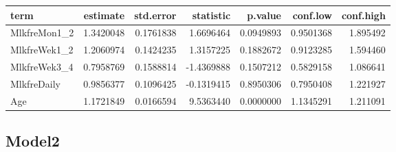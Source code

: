 \documentclass[]{article}
\newenvironment{Shaded}{\begin{snugshade}}{\end{snugshade}}
\newcommand{\DataTypeTok}[1]{\textcolor[rgb]{0.13,0.29,0.53}{#1}}
\newcommand{\KeywordTok}[1]{\textcolor[rgb]{0.13,0.29,0.53}{\textbf{#1}}}
\newcommand{\NormalTok}[1]{#1}
\newcommand{\OperatorTok}[1]{\textcolor[rgb]{0.81,0.36,0.00}{\textbf{#1}}}
\newcommand{\OtherTok}[1]{\textcolor[rgb]{0.56,0.35,0.01}{#1}}
\newcommand{\StringTok}[1]{\textcolor[rgb]{0.31,0.60,0.02}{#1}}
\begin{document}
\begin{longtable}[]{@{}lrrrrrr@{}}
\toprule
term & estimate & std.error & statistic & p.value & conf.low &
conf.high\tabularnewline
\midrule
\endhead
MlkfreMon1\_2 & 1.3420048 & 0.1761838 & 1.6696464 & 0.0949893 &
0.9501368 & 1.895492\tabularnewline
MlkfreWek1\_2 & 1.2060974 & 0.1424235 & 1.3157225 & 0.1882672 &
0.9123285 & 1.594460\tabularnewline
MlkfreWek3\_4 & 0.7958769 & 0.1588814 & -1.4369888 & 0.1507212 &
0.5829158 & 1.086641\tabularnewline
MlkfreDaily & 0.9856377 & 0.1096425 & -0.1319415 & 0.8950306 & 0.7950408
& 1.221927\tabularnewline
Age & 1.1721849 & 0.0166594 & 9.5363440 & 0.0000000 & 1.1345291 &
1.211091\tabularnewline
\bottomrule
\end{longtable}

\hypertarget{model2-7}{%
\subsection{Model2}\label{model2-7}}

\begin{Shaded}
\end{Shaded}
\end{document}

